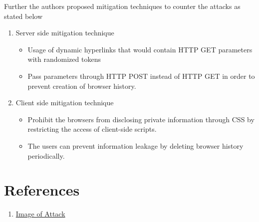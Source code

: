 \documentclass{article}
\begin{document}
Further the authors proposed mitigation techniques to counter the attacks as stated below
\begin{enumerate}
\item  Server­ side mitigation technique
\begin{itemize}
\item Usage of dynamic hyperlinks that would contain HTTP GET parameters with randomized tokens
\item Pass parameters through HTTP POST instead of HTTP GET in order to prevent creation of browser history.
\end{itemize}
   
\item  Client ­side mitigation technique 
\begin{itemize}
\item	Prohibit the browsers from disclosing private information through CSS by restricting the access of client-side scripts. 
\item	The users can prevent information leakage by deleting browser history periodically. 
\end{itemize}
\end{enumerate}

 
\section*{References}

\begin{enumerate}
\item  \href{http://www.cs.wustl.edu/~jain/cse571-11/ftp/social/index.html}{Image of Attack}
\end{enumerate}
\end{document}
